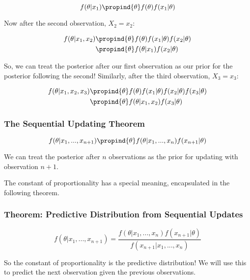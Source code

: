 \documentclass[a4paper]{article}
\begin{document}
            \[
                f(\theta | x_1) \propind{\theta} f(\theta)f(x_1 | \theta)
            \]

            Now after the second observation, $X_2 = x_2$:

            \begin{align*}
                f(\theta | x_1, x_2) &\propind{\theta} f(\theta) f(x_1 | \theta)
                    f(x_2 | \theta) \\
                & \propind{\theta} f(\theta | x_1) f(x_2 | \theta)
            \end{align*}

            So, we can treat the posterior after our first observation as our
            prior for the posterior following the second! Similarly, after the
            third observation, $X_3 = x_3$:

            \begin{align*}
                f(\theta | x_1, x_2, x_3) & \propind{\theta} f(\theta) f(x_1 |
                    \theta) f(x_2 | \theta) f(x_3 | \theta) \\
                & \propind{\theta} f(\theta | x_1, x_2) f(x_3 | \theta)
            \end{align*}

            \subsubsection{The Sequential Updating Theorem}
                \[
                    f(\theta | x_1, ..., x_{n+1}) \propind{\theta} f(\theta |
                    x_1, ..., x_n) f(x_{n+1} | \theta)
                \]

                We can treat the posterior after $n$ observations as the prior
                for updating with observation $n + 1$.

                The constant of proportionality has a special meaning,
                encapsulated in the following theorem.

            \subsubsection{Theorem: Predictive Distribution from Sequential
            Updates}
                \[
                    f(\theta | x_1, ..., x_{n + 1}) = \frac{f(\theta | x_1, ...,
                    x_n)f(x_{n+1} | \theta)}{f(x_{n+1} | x_1, ..., x_n)}
                \]

                So the constant of proportionality is the predictive
                distribution! We will use this to predict the next observation
                given the previous observations.
\end{document}
